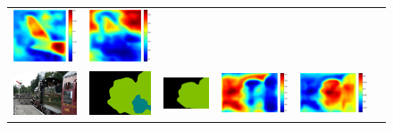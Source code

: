 \documentclass[10pt,twocolumn,letterpaper]{article}
\begin{document}
\begin{figure}
\begin{tabular}{c c c c c c}
   \includegraphics[height=0.122\linewidth]{fig/voc12/att2/2007_001568.pdf} &
   \includegraphics[height=0.122\linewidth]{fig/voc12/att3/2007_001568.pdf} \\
   \includegraphics[height=0.085\linewidth]{fig/voc12/img/2007_006802.jpg} &
   \includegraphics[height=0.085\linewidth]{fig/voc12/res_baseline/2007_006802.png} &
   \includegraphics[height=0.085\linewidth]{fig/voc12/res_sharenet/2007_006802.png} &
   \includegraphics[height=0.085\linewidth]{fig/voc12/att1/2007_006802.pdf} &
   \includegraphics[height=0.085\linewidth]{fig/voc12/att2/2007_006802.pdf} &

\end{tabular}
\end{figure}
\end{document}
